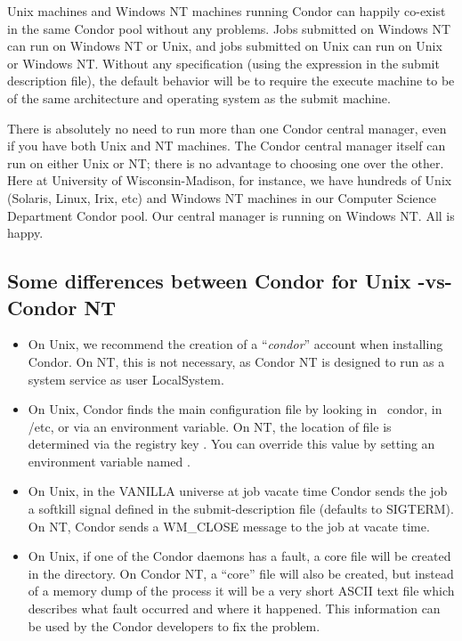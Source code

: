 Unix machines and Windows NT machines running Condor can happily
co-exist in the same Condor pool without any problems.
Jobs submitted on Windows NT can run on Windows NT or Unix,
and jobs submitted on Unix can run on Unix or Windows NT.
Without any specification
(using the  expression in the submit description file),
the default behavior will be to 
require the execute machine to be of the same architecture and operating
system as the submit machine.

There is absolutely no need to run more than one Condor central manager,
even if you have both Unix and NT machines.  The Condor central manager
itself can run on either Unix or NT; there is no advantage to choosing
one over the other.  Here at University of Wisconsin-Madison, for
instance, we have hundreds of Unix (Solaris, Linux, Irix, etc) and
Windows NT machines in our Computer Science Department Condor pool.
Our central manager is running on Windows NT.  All is happy.

\subsection{Some differences between Condor for Unix -vs- Condor NT}

\begin{itemize}

\item On Unix, we recommend the creation of a ``\textit{condor}'' account
when installing Condor.  On NT, this is not necessary, as Condor NT is
designed to run as a system service as user LocalSystem.

\item On Unix, Condor finds the  main configuration
file by looking in ~condor, in /etc, or via an environment variable.
On NT, the location of  file is determined
via the registry key .
You can override this value by setting an environment variable named
.

\item On Unix, in the VANILLA universe at job vacate time Condor sends the
job a softkill signal defined in the submit-description file (defaults to
SIGTERM).  On NT, Condor sends a WM\_CLOSE message to the job at vacate
time.

\item On Unix, if one of the Condor daemons has a fault, a core file
will be created in the  directory.  On Condor NT, a
``core'' file will also be created, but instead of a memory dump of the
process it will be a very short ASCII text file which describes what
fault occurred and where it happened.  This information can be used by
the Condor developers to fix the problem.

\end{itemize}


